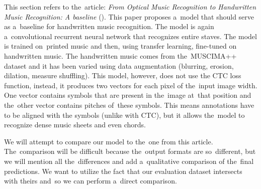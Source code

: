 This section refers to the~article: \emph{From Optical Music Recognition to Handwritten Music Recognition: A baseline} (\cite{HmrBaseline}). This paper proposes a~model that should serve as a~baseline for handwritten music recognition. The model is again a~convolutional recurrent neural network that recognizes entire staves. The model is trained on~printed music and then, using transfer learning, fine-tuned on handwritten music. The handwritten music comes from the~MUSCIMA++ dataset and it has been varied using data augmentation (blurring, erosion, dilation, measure shuffling). This model, however, does not use the CTC loss function, instead, it produces two vectors for each pixel of the~input image width. One vector contains symbols that are present in the~image at~that position and the~other vector contains pitches of~these symbols. This means annotations have to be aligned with the symbols (unlike with CTC), but it allows the~model to recognize dense music sheets and even chords.

We will attempt to compare our model to the~one from this article. The~comparison will be difficult because the~output formats are so~different, but we will mention all the~differences and add a~qualitative comparison of the~final predictions. We want to utilize the fact that our evaluation dataset intersects with theirs and~so we can perform a~direct comparison.
